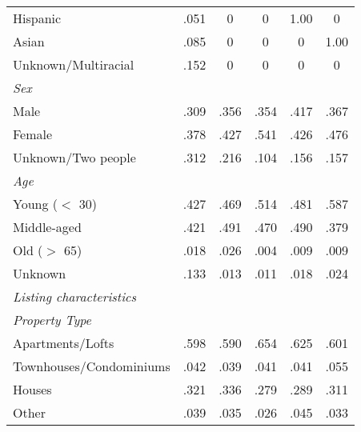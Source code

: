 {\begin{longtable}{l*{5}{c}}
Hispanic     &      .051         &       0         &      0         &      1.00 	& 		0         \\
Asian     &      .085      &       0         &      0         &      0 	& 		1.00         \\
Unknown/Multiracial     &      .152         &       0         &      0         &      0 	& 		0         \\
[1em]
\textit{Sex} \\
Male     &      .309         &       .356         &      .354         &      .417 	& 		.367        \\
Female     &      .378         &       .427        &      .541         &      .426 	& 		.476         \\
Unknown/Two people     &      .312         &       .216         &      .104         &      .156 	& 		.157         \\
[1em]
\textit{Age} \\
Young ($<$ 30)     &      .427         &       .469         &      .514        &      .481 	& 		.587         \\
Middle-aged     &      .421         &       .491        &      .470         &      .490 		& 		.379         \\
Old ($>$ 65)     &      .018         &       .026         &      .004         &      .009	& 		.009         \\
Unknown     &      .133         &       .013         &      .011         &      .018 	& 		.024         \\
[1em]
\textit{Listing characteristics} \\
\hline
\textit{Property Type} \\
Apartments/Lofts     			&      .598         &       .590         &      .654        &      .625 			& 	.601         \\
Townhouses/Condominiums     &      .042         &      .039         &      .041        &      .041 	& 		.055         \\
Houses    					&      .321         &       .336        &      .279        &      .289				& 		.311         \\
Other    					&      .039      &       .035        &      .026        &      .045	& 		.033        \\
[1em]


\end{longtable}}
